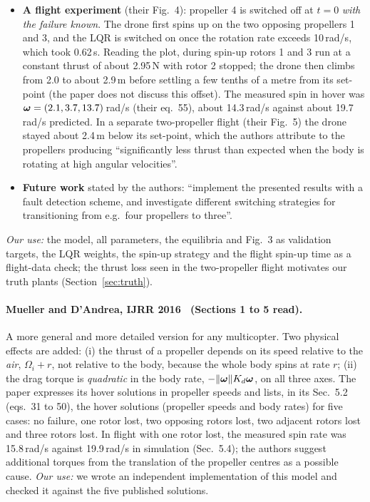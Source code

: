 \begin{itemize}
  \item \textbf{A flight experiment} (their Fig.~4): propeller 4 is switched off at $t=0$ \emph{with the failure known}. The drone first spins up on the two opposing propellers 1 and 3, and the LQR is switched on once the rotation rate exceeds 10\,rad/s, which took 0.62\,s. Reading the plot, during spin-up rotors 1 and 3 run at a constant thrust of about 2.95\,N with rotor 2 stopped; the drone then climbs from 2.0 to about 2.9\,m before settling a few tenths of a metre from its set-point (the paper does not discuss this offset). The measured spin in hover was $\boldsymbol{\omega} = (2.1, 3.7, 13.7)$\,rad/s (their eq.~55), about 14.3\,rad/s against about 19.7\,rad/s predicted. In a separate two-propeller flight (their Fig.~5) the drone stayed about 2.4\,m below its set-point, which the authors attribute to the propellers producing ``significantly less thrust than expected when the body is rotating at high angular velocities''.
  \item \textbf{Future work} stated by the authors: ``implement the presented results with a fault detection scheme, and investigate different switching strategies for transitioning from e.g.\ four propellers to three''.
\end{itemize}
\emph{Our use:} the model, all parameters, the equilibria and Fig.~3 as validation targets, the LQR weights, the spin-up strategy and the flight spin-up time as a flight-data check; the thrust loss seen in the two-propeller flight motivates our truth plants (Section~\ref{sec:truth}).

\paragraph{Mueller and D'Andrea, IJRR 2016~\cite{mueller2016relaxed} (Sections 1 to 5 read).}
A more general and more detailed version for any multicopter. Two physical effects are added: (i) the thrust of a propeller depends on its speed relative to the \emph{air}, $\Omega_i + r$, not relative to the body, because the whole body spins at rate $r$; (ii) the drag torque is \emph{quadratic} in the body rate, $-\|\boldsymbol{\omega}\|K_d\boldsymbol{\omega}$, on all three axes. The paper expresses its hover solutions in propeller speeds and lists, in its Sec.~5.2 (eqs.~31 to 50), the hover solutions (propeller speeds and body rates) for five cases: no failure, one rotor lost, two opposing rotors lost, two adjacent rotors lost and three rotors lost. In flight with one rotor lost, the measured spin rate was 15.8\,rad/s against 19.9\,rad/s in simulation (Sec.~5.4); the authors suggest additional torques from the translation of the propeller centres as a possible cause.
\emph{Our use:} we wrote an independent implementation of this model and checked it against the five published solutions.


